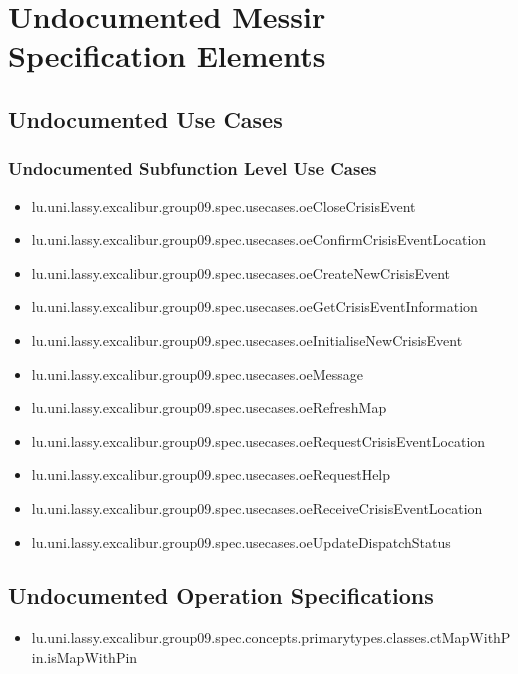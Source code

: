 	
\chapter{Undocumented Messir Specification Elements}


\section[Undocumented Use Cases]{Undocumented Use Cases}



\subsection[Undocumented Use Cases - Subfunction Level]{Undocumented Subfunction Level Use Cases}
\begin{itemize}
\item lu.uni.lassy.excalibur.group09.spec.usecases.oeCloseCrisisEvent 
\item lu.uni.lassy.excalibur.group09.spec.usecases.oeConfirmCrisisEventLocation 
\item lu.uni.lassy.excalibur.group09.spec.usecases.oeCreateNewCrisisEvent 
\item lu.uni.lassy.excalibur.group09.spec.usecases.oeGetCrisisEventInformation 
\item lu.uni.lassy.excalibur.group09.spec.usecases.oeInitialiseNewCrisisEvent 
\item lu.uni.lassy.excalibur.group09.spec.usecases.oeMessage 
\item lu.uni.lassy.excalibur.group09.spec.usecases.oeRefreshMap 
\item lu.uni.lassy.excalibur.group09.spec.usecases.oeRequestCrisisEventLocation 
\item lu.uni.lassy.excalibur.group09.spec.usecases.oeRequestHelp 
\item lu.uni.lassy.excalibur.group09.spec.usecases.oeReceiveCrisisEventLocation 
\item lu.uni.lassy.excalibur.group09.spec.usecases.oeUpdateDispatchStatus 
\end{itemize}























\section[Undocumented Operation Specifications]{Undocumented Operation Specifications}
\begin{itemize}
\item lu.uni.lassy.excalibur.group09.spec.concepts.primarytypes.classes.ctMapWithPin.isMapWithPin 
\end{itemize}








